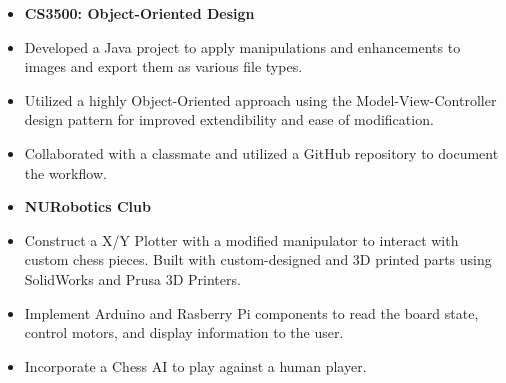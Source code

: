 \documentclass[10pt,a4paper,ragged2e,withhyper]{altacv}
\begin{document}
\begin{paracol}{2}

    \switchcolumn


    \vspace{-2em}
    \begin{itemize}
        \item[] \textbf{CS3500: Object-Oriented Design}
        \item Developed a Java project to apply manipulations and enhancements to images and export them as various file types.
        \item Utilized a highly Object-Oriented approach using the Model-View-Controller design pattern for improved extendibility and ease of modification.
        \item Collaborated with a classmate and utilized a GitHub repository to document the workflow.
    \end{itemize}

    \begin{itemize}
        \item[] \textbf{NURobotics Club}
        \item Construct a X/Y Plotter with a modified manipulator to interact with custom chess pieces. Built with custom-designed and 3D printed parts using SolidWorks and Prusa 3D Printers.
        \item Implement Arduino and Rasberry Pi components to read the board state, control motors, and display information to the user.
        \item Incorporate a Chess AI to play against a human player.
    \end{itemize}


\end{paracol}
\end{document}
